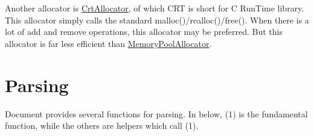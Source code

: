 Another allocator is {\ttfamily \hyperlink{class_crt_allocator}{Crt\+Allocator}}, of which C\+RT is short for C Run\+Time library. This allocator simply calls the standard {\ttfamily malloc()}/{\ttfamily realloc()}/{\ttfamily free()}. When there is a lot of add and remove operations, this allocator may be preferred. But this allocator is far less efficient than {\ttfamily \hyperlink{class_memory_pool_allocator}{Memory\+Pool\+Allocator}}.\hypertarget{md_Cadriciel_Commun_Externe_RapidJSON_doc_sax.zh-cn_Parsing}{}\section{Parsing}\label{md_Cadriciel_Commun_Externe_RapidJSON_doc_sax.zh-cn_Parsing}
{\ttfamily Document} provides several functions for parsing. In below, (1) is the fundamental function, while the others are helpers which call (1).


